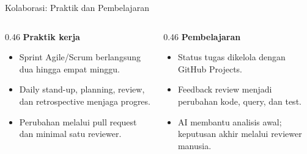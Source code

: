 \begin{comparisonframe}{Kolaborasi: Praktik dan Pembelajaran}
    \begin{columns}[T,onlytextwidth]
        \begin{column}{0.46\textwidth}
            \textbf{Praktik kerja}\par
            \begin{itemize}\setlength{\itemsep}{3pt}
                \item Sprint Agile/Scrum berlangsung dua hingga empat minggu.
                \item Daily stand-up, planning, review, dan retrospective menjaga progres.
                \item Perubahan melalui pull request dan minimal satu reviewer.
            \end{itemize}
        \end{column}
        \begin{column}{0.46\textwidth}
            \textbf{Pembelajaran}\par
            \begin{itemize}\setlength{\itemsep}{3pt}
                \item Status tugas dikelola dengan GitHub Projects.
                \item Feedback review menjadi perubahan kode, query, dan test.
                \item AI membantu analisis awal; keputusan akhir melalui reviewer manusia.
            \end{itemize}
        \end{column}
    \end{columns}
\end{comparisonframe}

